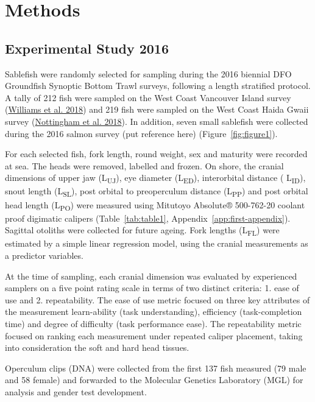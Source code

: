 \documentclass[12pt]{article}\usepackage[]{graphicx}\usepackage[]{color}
\begin{document}
\hypertarget{methods}{%
\section{Methods}\label{methods}}

\hypertarget{experimental-study-2016}{%
\subsection{Experimental Study 2016}\label{experimental-study-2016}}

Sablefish were randomly selected for sampling during the 2016 biennial DFO Groundfish Synoptic Bottom Trawl surveys, following a length stratified protocol. A tally of 212 fish were sampled on the West Coast Vancouver Island survey (\protect\hyperlink{ref-Williams2018}{Williams et al. 2018}) and 219 fish were sampled on the West Coast Haida Gwaii survey (\protect\hyperlink{ref-Nottingham2018}{Nottingham et al. 2018}). In addition, seven small sablefish were collected during the 2016 salmon survey (put reference here) (Figure~\ref{fig:figure1}).

For each selected fish, fork length, round weight, sex and maturity were recorded at sea. The heads were removed, labelled and frozen. On shore, the cranial dimensions of upper jaw (L\textsubscript{UJ}), eye diameter (L\textsubscript{ED}), interorbital distance ( L\textsubscript{ID}), snout length (L\textsubscript{SL}), post orbital to preoperculum distance (L\textsubscript{PP}) and post orbital head length (L\textsubscript{PO}) were measured using Mitutoyo Absolute® 500-762-20 coolant proof digimatic calipers (Table~\ref{tab:table1}, Appendix~\ref{app:first-appendix}). Sagittal otoliths were collected for future ageing. Fork lengths (L\textsubscript{FL}) were estimated by a simple linear regression model, using the cranial measurements as a predictor variables.

At the time of sampling, each cranial dimension was evaluated by experienced samplers on a five point rating scale in terms of two distinct criteria: 1. ease of use and 2. repeatability. The ease of use metric focused on three key attributes of the measurement learn-ability (task understanding), efficiency (task-completion time) and degree of difficulty (task performance ease). The repeatability metric focused on ranking each measurement under repeated caliper placement, taking into consideration the soft and hard head tissues.

Operculum clips (DNA) were collected from the first 137 fish measured (79 male and 58 female) and forwarded to the Molecular Genetics Laboratory (MGL) for analysis and gender test development.
\end{document}

